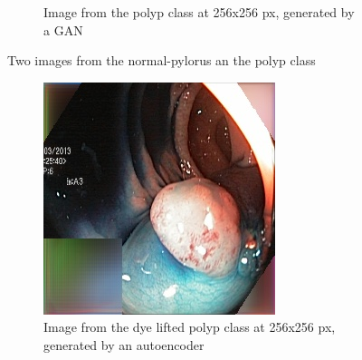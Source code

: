 \begin{figure}
\begin{subfigure}[t]{0.4\textwidth}
            \caption{Image from the polyp class at 256x256 px, generated by a GAN }    
            \label{fig:p_GAN_both1}
        \end{subfigure}
        \caption{Two images from the normal-pylorus an the polyp class} 
        \label{fig:AE_GAN_BOTH1}
    \end{figure}
    
    \begin{figure}
        \centering
        \begin{subfigure}[t]{0.4\textwidth}
            \centering
            \includegraphics[width=\textwidth]{experiments/figures/both/DLAE.jpg}
            \caption{Image from the dye lifted polyp class at 256x256 px, generated by an autoencoder }    
            \label{fig:dlp_AE_BOTH2}
        \end{subfigure}
        \qquad
        \begin{subfigure}[t]{0.4\textwidth}  
            \centering 

\end{subfigure}
\end{figure}
